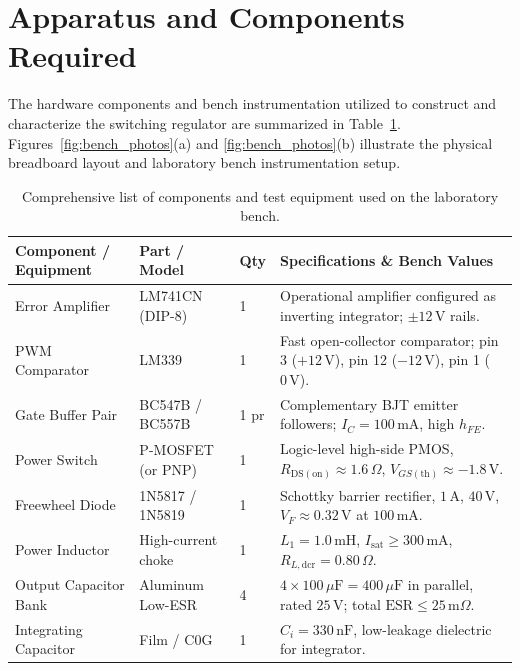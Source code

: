 \documentclass[12pt,a4paper]{article}
\newcommand{\Rdson}{R_{\mathrm{DS(on)}}}
\newcommand{\DCR}{R_{L,\mathrm{dcr}}}
\newcommand{\ESR}{\mathrm{ESR}}
\begin{document}
\section{Apparatus and Components Required}
\label{sec:apparatus}

The hardware components and bench instrumentation utilized to construct and characterize the switching regulator are summarized in Table~\ref{tab:apparatus}. Figures~\ref{fig:bench_photos}(a) and \ref{fig:bench_photos}(b) illustrate the physical breadboard layout and laboratory bench instrumentation setup.

\begin{table}[H]
\centering
\footnotesize
\caption{Comprehensive list of components and test equipment used on the laboratory bench.}
\label{tab:apparatus}
\renewcommand{\arraystretch}{1.08}
\begin{tabularx}{\linewidth}{lllX}
\toprule
\textbf{Component / Equipment} & \textbf{Part / Model} & \textbf{Qty} & \textbf{Specifications \& Bench Values} \\
\midrule
Error Amplifier & LM741CN (DIP-8) & 1 & Operational amplifier configured as inverting integrator; $\pm12\,\mathrm{V}$ rails. \\
PWM Comparator & LM339 & 1 & Fast open-collector comparator; pin 3 ($+12\,\mathrm{V}$), pin 12 ($-12\,\mathrm{V}$), pin 1 ($0\,\mathrm{V}$). \\
Gate Buffer Pair & BC547B / BC557B & 1 pr & Complementary BJT emitter followers; $I_C = 100\,\mathrm{mA}$, high $h_{FE}$. \\
Power Switch & P-MOSFET (or PNP) & 1 & Logic-level high-side PMOS, $\Rdson \approx 1.6\,\Omega$, $V_{GS(\mathrm{th})} \approx -1.8\,\mathrm{V}$. \\
Freewheel Diode & 1N5817 / 1N5819 & 1 & Schottky barrier rectifier, $1\,\mathrm{A}$, $40\,\mathrm{V}$, $V_F \approx 0.32\,\mathrm{V}$ at $100\,\mathrm{mA}$. \\
Power Inductor & High-current choke & 1 & $L_1 = 1.0\,\mathrm{mH}$, $I_{\mathrm{sat}} \ge 300\,\mathrm{mA}$, $\DCR = 0.80\,\Omega$. \\
Output Capacitor Bank & Aluminum Low-ESR & 4 & $4 \times 100\,\mu\mathrm{F} = 400\,\mu\mathrm{F}$ in parallel, rated $25\,\mathrm{V}$; total $\ESR \le 25\,\mathrm{m}\Omega$. \\
Integrating Capacitor & Film / C0G & 1 & $C_i = 330\,\mathrm{nF}$, low-leakage dielectric for integrator. \\

\end{tabularx}
\end{table}
\end{document}
